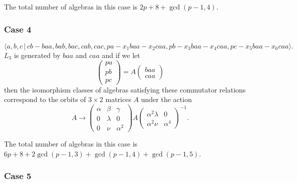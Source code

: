 \documentclass[10pt]{article}
\begin{document}
The total number of algebras in this case is $2p+8+\gcd (p-1,4)$.

\subsubsection{Case 4}

\begin{equation}
\langle
a,b,c\,|%
\,cb-baa,bab,bac,cab,cac,pa-x_{1}baa-x_{2}caa,pb-x_{3}baa-x_{4}caa,pc-x_{5}baa-x_{6}caa\rangle .
\tag{7.760}
\end{equation}%
$L_{3}$ is generated by $baa$ and $caa$ and if we let 
\[
\left( 
\begin{array}{l}
pa \\ 
pb \\ 
pc%
\end{array}%
\right) =A\left( 
\begin{array}{l}
baa \\ 
caa%
\end{array}%
\right) 
\]%
then the isomorphism classes of algebras satisfying these commutator
relations correspond to the orbits of $3\times 2$ matrices $A$ under the
action 
\[
A\rightarrow \left( 
\begin{array}{lll}
\alpha & \beta & \gamma \\ 
0 & \lambda & 0 \\ 
0 & \nu & \alpha ^{2}%
\end{array}%
\right) A\left( 
\begin{array}{ll}
\alpha ^{2}\lambda & 0 \\ 
\alpha ^{2}\nu & \alpha ^{4}%
\end{array}%
\right) ^{-1}. 
\]%
$\allowbreak $

The total number of algebras in this case is $6p+8+2\gcd (p-1,3)+\gcd
(p-1,4)+\gcd (p-1,5)$.

\subsubsection{Case 5}
\end{document}
